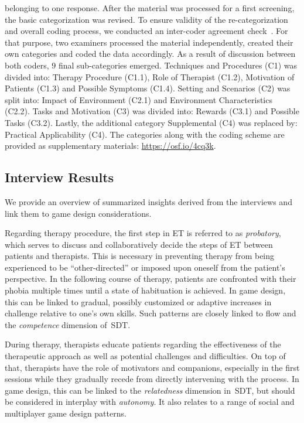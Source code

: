 belonging to one response. After the material was processed for a first screening, the basic categorization was revised. To ensure validity of the re-categorization and overall coding process, we conducted an inter-coder agreement check~\cite{mayring2000}. For that purpose, two examiners processed the material independently, created their own categories and coded the data accordingly. As a result of discussion between both coders, $9$ final sub-categories emerged. Techniques and Procedures (C1) was divided into: Therapy Procedure (C1.1), Role of Therapist (C1.2), Motivation of Patients (C1.3) and Possible Symptoms (C1.4). Setting and Scenarios (C2) was split into: Impact of Environment (C2.1) and Environment Characteristics (C2.2). Tasks and Motivation (C3) was divided into: Rewards (C3.1) and Possible Tasks (C3.2). Lastly, the additional category Supplemental (C4) was replaced by: Practical Applicability (C4). The categories along with the coding scheme are provided as supplementary materials: \url{https://osf.io/4cq3k}.

\subsection{Interview Results}
We provide an overview of summarized insights derived from the interviews and link them to game design considerations. 

Regarding therapy procedure, the first step in \ac{ET} %
is referred to as \textit{probatory}, which serves to discuss and collaboratively decide the steps of \ac{ET} %
between patients and therapists. This is necessary in preventing therapy from being experienced to be ``other-directed'' or imposed upon oneself from the patient's perspective. In the following course of therapy, patients are confronted with their phobia multiple times until a state of habituation is achieved. In game design, this can be linked to gradual, possibly customized or adaptive increases in challenge relative to one's own skills. Such patterns are closely linked to flow and the \textit{competence} dimension of~\ac{SDT}.

During therapy, therapists educate patients regarding the effectiveness of the therapeutic approach as well as potential challenges and difficulties. On top of that, therapists have the role of motivators and companions, especially in the first sessions while they gradually recede from directly intervening with the process. In game design, this can be linked to the \textit{relatedness} dimension in~\ac{SDT}, but should be considered in interplay with \textit{autonomy}. It also relates to a range of social and multiplayer game design patterns.

